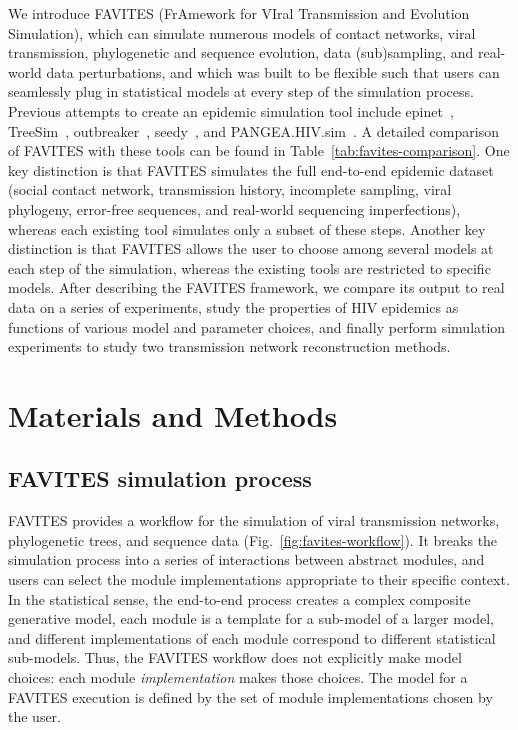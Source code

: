We introduce FAVITES (FrAmework for VIral Transmission and Evolution Simulation), which can simulate numerous models of contact networks, viral transmission, phylogenetic and sequence evolution, data (sub)sampling, and real-world data perturbations, and which was built to be flexible such that users can seamlessly plug in statistical models at every step of the simulation process. Previous attempts to create an epidemic simulation tool include epinet~\cite{Groendyke2012}, TreeSim~\cite{Stadler2013}, outbreaker~\cite{Jombart2014}, seedy~\cite{Worby2015}, and PANGEA.HIV.sim~\cite{Ratmann2017}. A detailed comparison of FAVITES with these tools can be found in Table~\ref{tab:favites-comparison}. One key distinction is that FAVITES simulates the full end-to-end epidemic dataset (social contact network, transmission history, incomplete sampling, viral phylogeny, error-free sequences, and real-world sequencing imperfections), whereas each existing tool simulates only a subset of these steps. Another key distinction is that FAVITES allows the user to choose among several models at each step of the simulation, whereas the existing tools are restricted to specific models. After describing the FAVITES framework,  we compare its output to real data on a series of experiments, study the properties of \gls{HIV} epidemics as functions of various model and parameter choices, and finally perform simulation experiments to study two transmission network reconstruction methods.

\section{Materials and Methods}
\subsection{FAVITES simulation process}\label{sec:favites-process}
FAVITES provides a workflow for the simulation of viral transmission networks, phylogenetic trees, and sequence data (Fig.~\ref{fig:favites-workflow}). It breaks the simulation process into a series of interactions between abstract modules, and users can select the module implementations appropriate to their specific context. In the statistical sense, the end-to-end process creates a complex composite generative model, each module is a template for a sub-model of a larger model, and different implementations of each module correspond to different statistical sub-models. Thus, the FAVITES workflow does not explicitly make model choices: each module \textit{implementation} makes those choices. The model for a FAVITES execution is defined by the set of module implementations chosen by the user.

